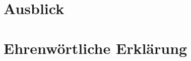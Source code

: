 \documentclass[
	12pt, %
	a4paper,
	listof=totoc, %
	bibliography=totoc, %
	numbers=noenddot, %
	ngerman, %
	headsepline, %
	oneside %
	]{scrbook} %
\begin{document}
\chapter{Ausblick}







%







\chapter*{Ehrenwörtliche Erklärung}
\end{document}
